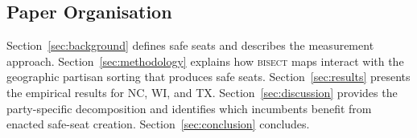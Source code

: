 \subsection{Paper Organisation}

Section~\ref{sec:background} defines safe seats and describes the measurement approach.
Section~\ref{sec:methodology} explains how \textsc{bisect} maps interact with the
geographic partisan sorting that produces safe seats. Section~\ref{sec:results}
presents the empirical results for NC, WI, and TX. Section~\ref{sec:discussion}
provides the party-specific decomposition and identifies which incumbents benefit from
enacted safe-seat creation. Section~\ref{sec:conclusion} concludes.
